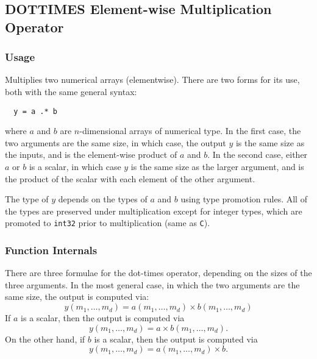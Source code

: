 %
%
%
\subsection{DOTTIMES Element-wise Multiplication Operator}
\subsubsection{Usage}
Multiplies two numerical arrays (elementwise).  There are two forms
for its use, both with the same general syntax:
\begin{verbatim}
  y = a .* b
\end{verbatim}
where $a$ and $b$ are $n$-dimensional arrays of numerical type.  In the
first case, the two arguments are the same size, in which case, the 
output $y$ is the same size as the inputs, and is the element-wise
product of $a$ and $b$.  In the second case, either $a$ or $b$ is a scalar, 
in which case $y$ is the same size as the larger argument,
and is the product of the scalar with each element of the other argument.

The type of $y$ depends on the types of $a$ and $b$ using type 
promotion rules. All of the types are preserved under multiplication except
 for integer types, which are promoted to \verb|int32| prior to 
multiplication (same as \verb|C|).
\subsubsection{Function Internals}
There are three formulae for the dot-times operator, depending on the
sizes of the three arguments.  In the most general case, in which 
the two arguments are the same size, the output is computed via:
\[
y(m_1,\ldots,m_d) = a(m_1,\ldots,m_d) \times b(m_1,\ldots,m_d)
\]
If $a$ is a scalar, then the output is computed via
\[
y(m_1,\ldots,m_d) = a \times b(m_1,\ldots,m_d).
\]
On the other hand, if $b$ is a scalar, then the output is computed via
\[
y(m_1,\ldots,m_d) = a(m_1,\ldots,m_d) \times b.
\]
